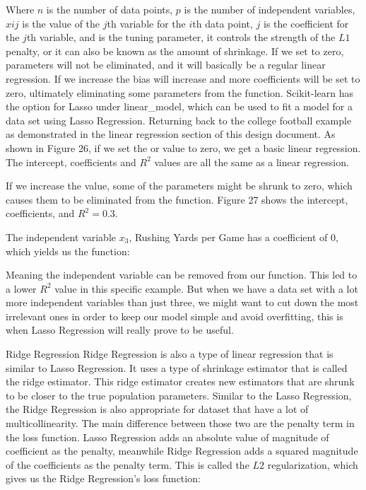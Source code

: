 \documentclass[a4paper,12pt]{report}
\begin{document}
Where $n$ is the number of data points, $p$ is the number of independent variables, $xij$ is the value of the $j$th variable for the $i$th data point, $j$ is the coefficient for the $j$th variable, and is the tuning parameter, it controls the strength of the $L1$ penalty, or it can also be known as the amount of shrinkage. If we set to zero, parameters will not be eliminated, and it will basically be a regular linear regression. If we increase the bias will increase and more coefficients will be set to zero, ultimately eliminating some parameters from the function. Scikit-learn has the option for Lasso under linear\_model, which can be used to fit a model for a data set using Lasso Regression. Returning back to the college football example as demonstrated in the linear regression section of this design document. As shown in Figure 26, if we set the or value to zero, we get a basic linear regression. The intercept, coefficients and $R^2$ values are all the same as a linear regression. 

If we increase the value, some of the parameters might be shrunk to zero, which causes them to be eliminated from the function. Figure 27 shows the intercept, coefficients, and $R^2=0.3$. 

The independent variable $x_3$, Rushing Yards per Game has a coefficient of 0, which yields us the function:

Meaning the independent variable  can be removed from our function. This led to a lower $R^2$ value in this specific example. But when we have a data set with a lot more independent variables than just three, we might want to cut down the most irrelevant ones in order to keep our model simple and avoid overfitting, this is when Lasso Regression will really prove to be useful. 

Ridge Regression
Ridge Regression is also a type of linear regression that is similar to Lasso Regression. It uses a type of shrinkage estimator that is called the ridge estimator. This ridge estimator creates new estimators that are shrunk to be closer to the true population parameters. Similar to the Lasso Regression, the Ridge Regression is also appropriate for dataset that have a lot of multicollinearity. The main difference between those two are the penalty term in the loss function. Lasso Regression adds an absolute value of magnitude of coefficient as the penalty, meanwhile Ridge Regression adds a squared magnitude of the coefficients as the penalty term. This is called the $L2$ regularization, which gives us the Ridge Regression’s loss function:
\end{document}
